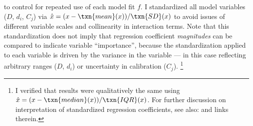 to control for repeated use of each model fit $f$.
I standardized all model variables ($D$, $d_i$, $C_j$) via
$\hat{x} = (x - \txn{mean}(x)) / \txn{SD}(x)$
to avoid issues of different variable scales and collinearity in interaction terms.
Note that this standardization does not imply that
regression coefficient \emph{magnitudes} can be compared to indicate variable ``importance'',
because the standardization applied to each variable is driven by the variance in the variable
--- in this case reflecting arbitrary ranges ($D$, $d_i$) or uncertainty in calibration ($C_j$).%
\footnote{I verified that results were qualitatively the same using
  $\hat{x} = (x - \txn{median}(x)) / \txn{IQR}(x)$.
  For further discussion on interpretation of standardized regression coefficients,
  see also:  and links therein.}
